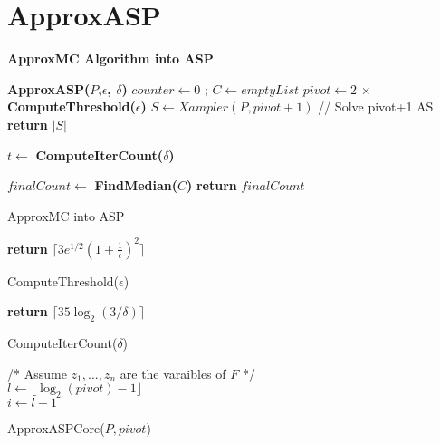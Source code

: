 \section{ApproxASP}

\textbf{ApproxMC Algorithm into ASP}

\begin{algorithm}[h]
\textbf{ApproxASP($P$,$\epsilon$, $\delta$)} \;
\SetAlgoLined
{}
 $counter \gets 0$ ; $C \gets emptyList$\;
 $pivot \gets  2 \, \times $ \textbf{ComputeThreshold($\epsilon$)} \;
 $S \gets Xampler(P, pivot + 1)$ // {Solve pivot+1 AS}  \;
 { %
 \textbf{return} $|S|$  
 } %
 { %
 $t \gets $ \textbf{ComputeIterCount($\delta$)} 
 
 } %
 $finalCount \gets $ \textbf{FindMedian($C$)} \;
 \textbf{return} $finalCount$
 
 \caption{ApproxMC into ASP}
\end{algorithm}


\begin{algorithm}
\textbf{return} $\lceil 3 e^{1/2} (1 + \frac{1}{\epsilon})^2 \rceil$
\caption{ComputeThreshold($\epsilon$)}
\end{algorithm}

\begin{algorithm}
\textbf{return} $\lceil 35 \log_2 (3/\delta) \rceil$
\caption{ComputeIterCount($\delta$)}
\end{algorithm}

\begin{algorithm}
/* Assume $z_1 , ..., z_n $ are the varaibles of $F$ */ \\
$ l \gets \lfloor \log_2 (pivot) - 1 \rfloor$ \\
$ i \gets l - 1$ \\


\caption{ApproxASPCore($P, pivot$)}
\end{algorithm}
